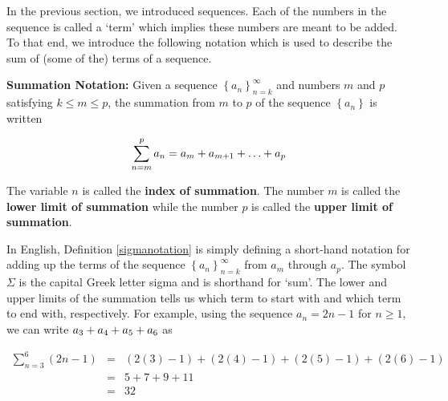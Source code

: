 

\setcounter{footnote}{0}

\label{Summation}

In the previous section, we introduced sequences.  Each of the numbers in the sequence is called a `term' which implies these numbers are meant to be added.  To that end, we introduce the following notation which is used to describe  the sum of (some of the) terms of a sequence.
\smallskip

\colorbox{ResultColor}{\bbm

\begin{defn} \textbf{Summation Notation:} \label{sigmanotation}  Given a sequence $\left\{ a_{n} \right\}_{n=k}^{\infty}$ and numbers $m$ and $p$ satisfying $k \leq m \leq p$, the summation from $m$ to $p$ of the sequence $\left\{a_{n}\right\}$ is written  

\[ \sum_{n=m}^{p} a_{n} = a_{m} + a_{m \mbox{\scriptsize$+ 1$}} + \ldots + a_{p}\]

The variable $n$ is called the  \textbf{index of summation}.   The number $m$ is called the  \textbf{lower limit of summation} while the number $p$ is called the  \textbf{upper limit of summation}.

\end{defn}


\ebm}

\smallskip

In English, Definition \ref{sigmanotation} is simply defining a short-hand notation for adding up the terms of the sequence $\left\{ a_{n} \right\}_{n=k}^{\infty}$  from $a_{m}$ through $a_{p}$. The symbol $\Sigma$ is the capital Greek letter sigma and is shorthand for `sum'.  The lower and upper limits of the summation tells us which term to start with and which term to end with, respectively. For example, using the sequence $a_{n} = 2n-1$ for $n \geq 1$, we can write  $a_{\mbox{\scriptsize$3$}} +a_{\mbox{\scriptsize$4$}} + a_{\mbox{\scriptsize$5$}} + a_{\mbox{\scriptsize$6$}}$ as 

\[ \begin{array}{rcl}

\displaystyle{\sum_{n=3}^{6}(2n-1) } & = & (2(3)-1) + (2(4)-1) + (2(5)-1) +  (2(6)-1) \\
                     & = &  5 + 7 + 9 + 11 \\
                     & = & 32 \\
\end{array} \]

